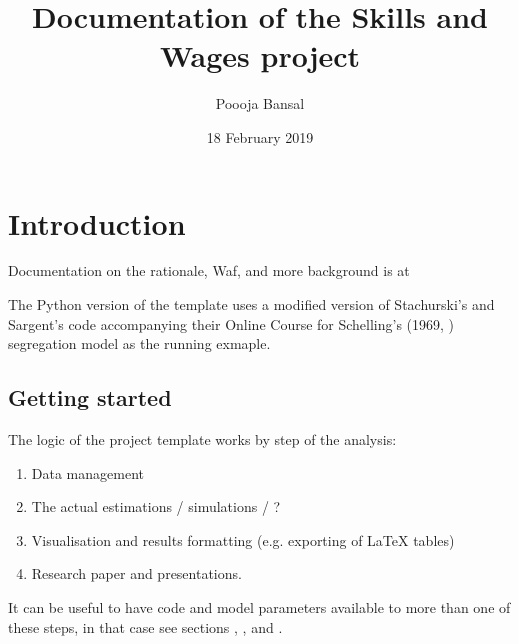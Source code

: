 \documentclass[a4paper,11pt,english]{sphinxmanual}
\title{Documentation of the Skills and Wages project}
\date{18 February 2019}
\author{Poooja Bansal}
\begin{document}
\pagestyle{empty}
\maketitle
\pagestyle{plain}
\sphinxtableofcontents
\pagestyle{normal}
\label{\detokenize{index::doc}}



\chapter{Introduction}
\label{\detokenize{introduction:introduction}}\label{\detokenize{introduction:id1}}\label{\detokenize{introduction::doc}}
Documentation on the rationale, Waf, and more background is at 

The Python version of the template uses a modified version of Stachurski’s and Sargent’s code accompanying their Online Course  for Schelling’s (1969, ) segregation model as the running exmaple.


\section{Getting started}
\label{\detokenize{introduction:getting-started}}\label{\detokenize{introduction:id4}}
  

The logic of the project template works by step of the analysis:
\begin{enumerate}
\def\theenumi{\arabic{enumi}}
\def\labelenumi{\theenumi .}
\makeatletter\def\p@enumii{\p@enumi \theenumi .}\makeatother
\item {} 
Data management

\item {} 
The actual estimations / simulations / ?

\item {} 
Visualisation and results formatting (e.g. exporting of LaTeX tables)

\item {} 
Research paper and presentations.

\end{enumerate}

It can be useful to have code and model parameters available to more than one of these steps, in that case see sections {\hyperref[\detokenize{model_specs:model-specifications}]{}}, {\hyperref[\detokenize{model_code:model-code}]{}}, and {\hyperref[\detokenize{library:library}]{}}.
\end{document}
